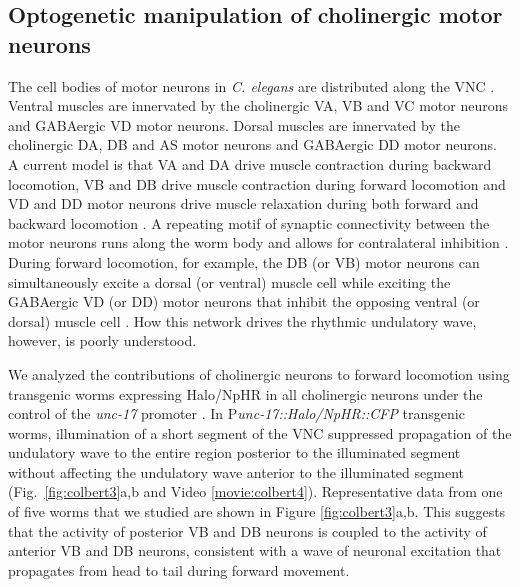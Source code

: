 \subsection{Optogenetic manipulation of cholinergic motor neurons}
The cell bodies of motor neurons in \textit{C. elegans} are distributed along the VNC \citep{von_stetina_motor_2006,wicks_dynamic_1996}. Ventral muscles are innervated by the cholinergic VA, VB and VC motor neurons and GABAergic VD motor neurons. Dorsal muscles are innervated by the cholinergic DA, DB and AS motor neurons and GABAergic DD motor neurons\citep{white_structure_1976,chen_wiring_2006}. A current model is that VA and DA drive muscle contraction during backward locomotion, VB and DB drive muscle contraction during forward locomotion and VD and DD motor neurons drive muscle relaxation during both forward and backward locomotion \citep{wicks_dynamic_1996,von_stetina_motor_2006,haspel_motoneurons_2010}. A repeating motif of synaptic connectivity between the motor neurons runs along the worm body and allows for contralateral inhibition \citep{von_stetina_motor_2006}. During forward locomotion, for example, the DB (or VB) motor neurons can simultaneously excite a dorsal (or ventral) muscle cell while exciting the GABAergic VD (or DD) motor neurons that inhibit the opposing ventral (or dorsal) muscle cell \citep{white_structure_1976,chen_wiring_2006}. How this network drives the rhythmic undulatory wave, however, is poorly understood.

We analyzed the contributions of cholinergic neurons to forward locomotion using transgenic worms expressing Halo/NpHR in all cholinergic neurons under the control of the \textit{unc-17} promoter \citep{roghani_molecular_1994}. In P\textit{unc-17::Halo/NpHR::CFP} transgenic worms, illumination of a short segment of the VNC suppressed propagation of the undulatory wave to the entire region posterior to the illuminated segment without affecting the undulatory wave anterior to the illuminated segment (Fig.~\ref{fig:colbert3}a,b and Video \ref{movie:colbert4}). Representative data from one of five worms that we studied are shown in Figure \ref{fig:colbert3}a,b. This suggests that the activity of posterior VB and DB neurons is coupled to the activity of anterior VB and DB neurons, consistent with a wave of neuronal excitation that propagates from head to tail during forward movement.

